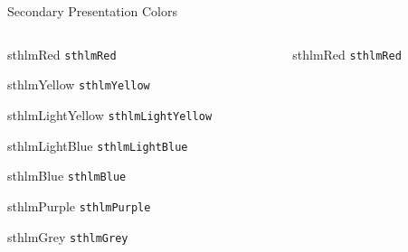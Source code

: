 \documentclass[compress,PxFont]{beamer}
\begin{document}
\begin{frame}{Secondary Presentation Colors}
\begin{columns}
\begin{column}{.48\linewidth}
	
\begin{beamercolorbox}[wd=\linewidth,ht=2ex,dp=0.7ex]{sthlmRed}
	\texttt{sthlmRed}
\end{beamercolorbox}

\begin{beamercolorbox}[wd=\linewidth,ht=2ex,dp=0.7ex]{sthlmYellow}
	\texttt{sthlmYellow}
\end{beamercolorbox}

\begin{beamercolorbox}[wd=\linewidth,ht=2ex,dp=0.7ex]{sthlmLightYellow}
	\texttt{sthlmLightYellow}
\end{beamercolorbox}

\begin{beamercolorbox}[wd=\linewidth,ht=2ex,dp=0.7ex]{sthlmLightBlue}
	\texttt{sthlmLightBlue}
\end{beamercolorbox}

\begin{beamercolorbox}[wd=\linewidth,ht=2ex,dp=0.7ex]{sthlmBlue}
	\texttt{sthlmBlue}
\end{beamercolorbox}

\begin{beamercolorbox}[wd=\linewidth,ht=2ex,dp=0.7ex]{sthlmPurple}
	\texttt{sthlmPurple}
\end{beamercolorbox}

\begin{beamercolorbox}[wd=\linewidth,ht=2ex,dp=0.7ex]{sthlmGrey}
	\texttt{sthlmGrey}
\end{beamercolorbox}

\end{column}

\begin{column}{.48\linewidth}
\begin{beamercolorbox}[wd=\linewidth,ht=2ex,dp=0.7ex]{sthlmRed}
	\texttt{sthlmRed}
\end{beamercolorbox}


\end{column}
\end{columns}
\end{frame}
\end{document}
